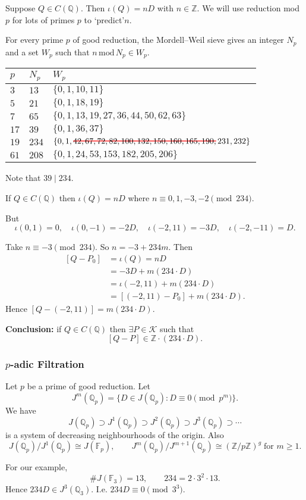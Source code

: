 \documentclass{beamer}
\newcommand\hcancel[2][black]{\setbox0=\hbox{$#2$}%
\rlap{\raisebox{.45\ht0}{\textcolor{#1}{\rule{\wd0}{1pt}}}}#2}
\newcommand{\Q}{{\mathbb Q}}
\newcommand{\Z}{{\mathbb Z}}
\newcommand{\F}{{\mathbb F}}
\newcommand{\cK}{\mathcal{K}}
\theoremstyle{definition}
\theoremstyle{remark}
\begin{document}
\begin{frame}
Suppose $Q \in C(\Q)$. Then $\iota(Q)=nD$ with $n \in \Z$.
We will use reduction mod $p$ for lots of primes $p$
to \lq predict\rq $n$.

For every prime $p$ of good reduction, the Mordell--Weil sieve
gives an integer $N_p$ and a set $W_p$ such
that $n \, \mathrm{mod} \, N_p \in W_p$.

\bigskip

\begin{tabular}{|l|l|l|}
\hline
$p$ & $N_p$ & $W_p$\\
\hline
$3$ & $13$ & $\{ 0, 1, 10, 11 \}$ \\
$5$ & $21$ & $\{ 0, 1, 18, 19 \} $ \\
$7$ & $ 65$ & $\{  0, 1, 13, 19, 27, 36, 44, 50, 62, 63 \}$\\
$17$ & $ 39$ & $\{  0, 1, 36, 37 \}$\\ 
$19$ & $234$ & $\{0, 1, \hcancel[red]{42, 67, 72, 82, 100, 132, 150, 160, 165, 190,} 231, 232\}$\\ 
$61$ & $208$ & $\{  0, 1, 24, 53, 153, 182, 205, 206\}$\\ 
\hline
\end{tabular}

\bigskip

Note that $39 \mid 234$.

\end{frame}
\begin{frame}
If $Q \in C(\Q)$ then $\iota(Q)=n D$
where $n \equiv 0,1,-3,-2 \pmod{234}$.

\bigskip

But
\[
\iota(0,1)=0,\quad
\iota(0,-1)=-2D, \quad
\iota(-2,11)=-3D, \quad
\iota(-2,-11)=D.
\]

Take $n \equiv -3 \pmod{234}$. So $n=-3+234m$. Then
\[
\begin{split}
[Q-P_0] &=\iota(Q)=nD\\
& =-3D+m(234\cdot D)\\
&=\iota(-2,11)+m(234 \cdot D)\\
& = [(-2,11)-P_0] + m (234 \cdot D).
\end{split}
\]
Hence $[Q-(-2,11)] = m(234 \cdot D)$.

\bigskip

\textbf{Conclusion:} if $Q \in C(\Q)$ then $\exists P
\in \cK$ such that
\[
[Q-P] \in \Z\cdot (234\cdot D) .
\]

\end{frame}

\begin{frame}
\frametitle{$p$-adic Filtration}
Let $p$ be a prime of good reduction. Let
\[
J^{m} (\Q_p)=\{ D \in J(\Q_p) : D \equiv 0 \pmod{p^m} \}.
\]
We have
\[
J(\Q_p) \supset J^{1}(\Q_p) \supset J^2(\Q_p) \supset J^3(\Q_p) \supset \cdots
\]
is a system of decreasing neighbourhoods of the origin.
Also
\[
J(\Q_p)/J^1(\Q_p) \cong J(\F_p), \qquad
J^{m}(\Q_p)/J^{m+1}(\Q_p) \cong (\Z/p\Z)^g \; \text{for $m \ge 1$}.
\]

\bigskip
For our example,
\[
\#J(\F_3)=13, \qquad 234=2 \cdot 3^2 \cdot 13.
\]
Hence $234 D \in J^{3}(\Q_3)$.
I.e. $234 D \equiv 0 \pmod{3^3}$.
\end{frame}
\end{document}
